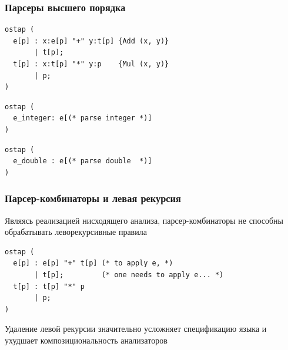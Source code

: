 \documentclass{beamer}
\begin{document}
\begin{frame}[fragile]
  \transwipe[direction=90]
  \frametitle{Парсеры высшего порядка}  
\begin{lstlisting}[frame=single]  
ostap (
  e[p] : x:e[p] "+" y:t[p] {Add (x, y)} 
       | t[p]; 
  t[p] : x:t[p] "*" y:p    {Mul (x, y)} 
       | p;
)
\end{lstlisting}
  
\begin{lstlisting}[frame=single]  
ostap (
  e_integer: e[(* parse integer *)]
)
\end{lstlisting}
  
\begin{lstlisting}[frame=single] 
ostap (
  e_double : e[(* parse double  *)]
)
\end{lstlisting}
\end{frame}


\begin{frame}[fragile]
  \transwipe[direction=90]
  \frametitle{Парсер-комбинаторы и левая рекурсия}  
Являясь реализацией нисходящего анализа, парсер-комбинаторы не способны обрабатывать леворекурсивные правила

\begin{lstlisting}[frame=single]  
ostap (
  e[p] : e[p] "+" t[p] (* to apply e, *)
       | t[p];         (* one needs to apply e... *)
  t[p] : t[p] "*" p    
       | p;
)
\end{lstlisting}

Удаление левой рекурсии значительно усложняет спецификацию языка и ухудшает композициональность анализаторов
\end{frame}
\end{document}
